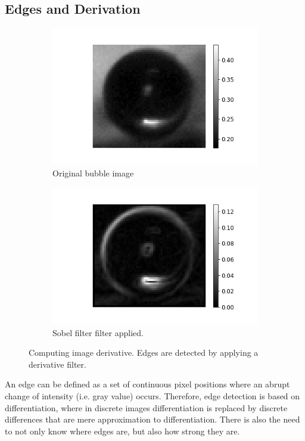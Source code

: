 		\subsection{Edges and Derivation}
		\begin{figure}
			\centering
			\begin{subfigure}[t]{.4\linewidth}
				\includegraphics[scale=0.5]{images/green_one.png}
				\caption{Original bubble image}
			\end{subfigure}
			
			\begin{subfigure}[t]{.4\linewidth}
				\includegraphics[scale=0.5]{images/green_one_sobel.png}
				\caption{Sobel filter filter applied.}
			\end{subfigure}
			
			\caption{Computing image derivative. Edges are detected by applying a derivative filter.}
			\label{fig:sobel_demo}
		\end{figure}
		An edge can be defined as a set of continuous pixel positions where an abrupt change of intensity (i.e. gray value) occurs. Therefore, edge detection is based on differentiation, where in discrete images differentiation is replaced by discrete differences that are mere approximation to differentiation. There is also the need to not only know where edges are, but also how strong they are.
		
